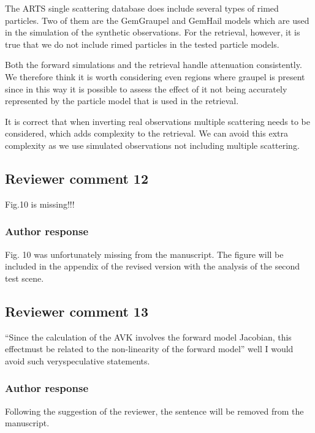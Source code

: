 \documentclass[11pt]{scrartcl}
\begin{document}
The ARTS single scattering database does include several types of rimed
particles. Two of them are the GemGraupel and GemHail models which are used in
the simulation of the synthetic observations. For the retrieval, however, it is
true that we do not include rimed particles in the tested particle models.

Both the forward simulations and the retrieval handle attenuation consistently.
We therefore think it is worth considering even regions where graupel is present
since in this way it is possible to assess the effect of it not being accurately
represented by the particle model that is used in the retrieval.

It is correct that when inverting real observations multiple scattering needs to be
considered, which adds complexity to the retrieval. We can avoid this extra complexity as
we use simulated observations not including multiple scattering.

\subsection*{Reviewer comment 12}

Fig.10 is missing!!!

\subsubsection*{Author response}

Fig. 10 was unfortunately missing from the manuscript. The figure will be included in the appendix
of the revised version with the analysis of the second test scene.

\subsection*{Reviewer comment 13}
 “Since the calculation of the AVK involves the forward model Jacobian, this effectmust be related to the non-linearity of the forward model” well I would avoid such veryspeculative statements.

\subsubsection*{Author response}

Following the suggestion of the reviewer, the sentence will be removed from the manuscript.
\end{document}
